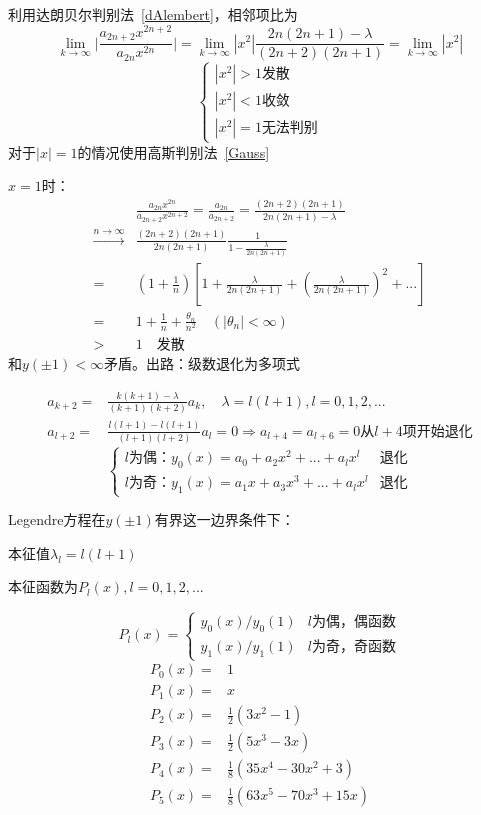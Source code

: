 \begin{ex}[Legendre方程的本征值问题]
利用达朗贝尔判别法~\ref{dAlembert}，相邻项比为
$$\lim_{k\rightarrow\infty}\bigg|\frac{a_{2n+2}x^{2n+2}}{a_{2n}x^{2n}}\bigg|=\lim_{k\rightarrow\infty}|x^2|\frac{2n(2n+1)-\lambda}{(2n+2)(2n+1)}=\lim_{k\rightarrow\infty}|x^2|$$
$$\begin{cases}
|x^2|>1 \mbox{发散}\\
|x^2|<1 \mbox{收敛}\\
|x^2|=1 \mbox{无法判别}
\end{cases}$$
对于$|x|=1$的情况使用高斯判别法~\ref{Gauss}

$x=1$时：
$$\begin{aligned}
&\frac{a_{2n}x^{2n}}{a_{2n+2}x^{2n+2}}=\frac{a_{2n}}{a_{2n+2}}=\frac{(2n+2)(2n+1)}{2n(2n+1)-\lambda}\\\stackrel{n\rightarrow\infty}{\longrightarrow}&\frac{(2n+2)(2n+1)}{2n(2n+1)}\frac{1}{1-\frac{\lambda}{2n(2n+1)}}\\
=&(1+\frac{1}{n})\left[1+\frac{\lambda}{2n(2n+1)}+\left(\frac{\lambda}{2n(2n+1)}\right)^2+...\right]\\
=&1+\frac{1}{n}+\frac{\theta_n}{n^2}\quad(|\theta_n|<\infty)\\
>&1\quad\mbox{发散}
\end{aligned}$$
和$y(\pm1)<\infty$矛盾。出路：级数退化为多项式

$$\begin{aligned}
a_{k+2}=&\frac{k(k+1)-\lambda}{(k+1)(k+2)}a_k,\quad\lambda=l(l+1),l=0,1,2,...\\
a_{l+2}=&\frac{l(l+1)-l(l+1)}{(l+1)(l+2)}a_l=0\Rightarrow a_{l+4}=a_{l+6}=0\mbox{从}l+4\mbox{项开始退化}
\end{aligned}$$
$$\begin{cases}
l\mbox{为偶：}y_0(x)=a_0+a_2x^2+...+a_lx^l&\mbox{退化}\\
l\mbox{为奇：}y_1(x)=a_1x+a_3x^3+...+a_lx^l&\mbox{退化}
\end{cases}$$

Legendre方程在$y(\pm1)$有界这一边界条件下：

本征值$\lambda_l=l(l+1)$

本征函数为$P_l(x),l=0,1,2,...$

$$P_l(x)=\begin{cases}
    y_0(x)/y_0(1) &l\mbox{为偶，偶函数}\\
    y_1(x)/y_1(1) &l\mbox{为奇，奇函数}
\end{cases}$$
$$\begin{aligned}
    P_0(x)=&1\\
    P_1(x)=&x\\
    P_2(x)=&\frac{1}{2}(3x^2-1)\\
    P_3(x)=&\frac{1}{2}(5x^3-3x)\\
    P_4(x)=&\frac{1}{8}(35x^4-30x^2+3)\\
    P_5(x)=&\frac{1}{8}(63x^5-70x^3+15x)
\end{aligned}$$
\end{ex}

